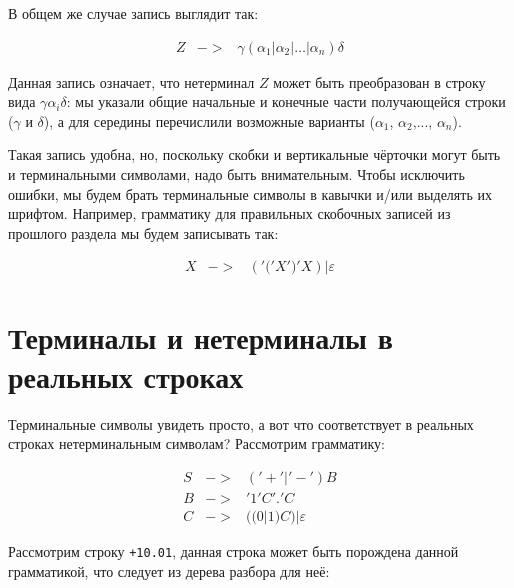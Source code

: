 \documentclass[12pt]{article}
\begin{document}
В общем же случае запись выглядит так:

\begin{bnf}\begin{eqnarray*}
Z &->& \gamma (\alpha_1 | \alpha_2 | \dots | \alpha_n) \delta
\end{eqnarray*}\end{bnf}

Данная запись означает, что нетерминал $Z$ может быть преобразован в строку
вида $\gamma\alpha_i\delta$: мы указали общие начальные и конечные 
части получающейся строки ($\gamma$ и $\delta$), а для середины перечислили возможные варианты
($\alpha_1$, $\alpha_2$,..., $\alpha_n$).

Такая запись удобна, но, поскольку скобки и вертикальные чёрточки могут быть и 
терминальными символами, надо быть внимательным.
Чтобы исключить ошибки, мы будем брать терминальные символы в кавычки и/или выделять 
их шрифтом. Например, грамматику для правильных скобочных записей из прошлого раздела 
мы будем записывать так:

\begin{bnf}\begin{eqnarray*}
X &->& ('\texttt{(}' X '\texttt{)}' X) | \varepsilon
\end{eqnarray*}\end{bnf}

\section{Терминалы и нетерминалы в реальных строках}
Терминальные символы увидеть просто, а вот что соответствует 
в реальных строках нетерминальным символам? Рассмотрим грамматику:

\begin{bnf}\begin{eqnarray*}
S &->& ('+'|'-') B\\
B &->& '1' C '.' C\\
C &->& ((0 | 1) C) | \varepsilon
\end{eqnarray*}\end{bnf}

Рассмотрим строку \verb!+10.01!, данная строка может быть порождена
данной грамматикой, что следует из дерева разбора для неё:
\end{document}
